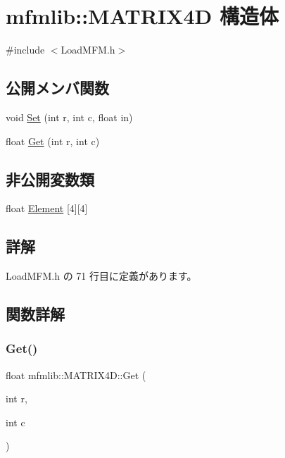 \hypertarget{structmfmlib_1_1_m_a_t_r_i_x4_d}{}\section{mfmlib\+:\+:M\+A\+T\+R\+I\+X4D 構造体}
\label{structmfmlib_1_1_m_a_t_r_i_x4_d}


{\ttfamily \#include $<$Load\+M\+F\+M.\+h$>$}

\subsection*{公開メンバ関数}
\begin{DoxyCompactItemize}
\item 
void \mbox{\hyperlink{structmfmlib_1_1_m_a_t_r_i_x4_d_a9401e25debd929fe663fd36c8fbdba1e}{Set}} (int r, int c, float in)
\item 
float \mbox{\hyperlink{structmfmlib_1_1_m_a_t_r_i_x4_d_a2e680fda9f3159b6ebfa1ce7c842ef48}{Get}} (int r, int c)
\end{DoxyCompactItemize}
\subsection*{非公開変数類}
\begin{DoxyCompactItemize}
\item 
float \mbox{\hyperlink{structmfmlib_1_1_m_a_t_r_i_x4_d_a2db454ab2b2a50783ca0c712b2f47d76}{Element}} \mbox{[}4\mbox{]}\mbox{[}4\mbox{]}
\end{DoxyCompactItemize}


\subsection{詳解}


 Load\+M\+F\+M.\+h の 71 行目に定義があります。



\subsection{関数詳解}
\mbox{\label{structmfmlib_1_1_m_a_t_r_i_x4_d_a2e680fda9f3159b6ebfa1ce7c842ef48}} 
\subsubsection{\texorpdfstring{Get()}{Get()}}
{\footnotesize\ttfamily float mfmlib\+::\+M\+A\+T\+R\+I\+X4\+D\+::\+Get (\begin{DoxyParamCaption}\item[{int}]{r,  }\item[{int}]{c }\end{DoxyParamCaption})\hspace{0.3cm}{\ttfamily [inline]}}




